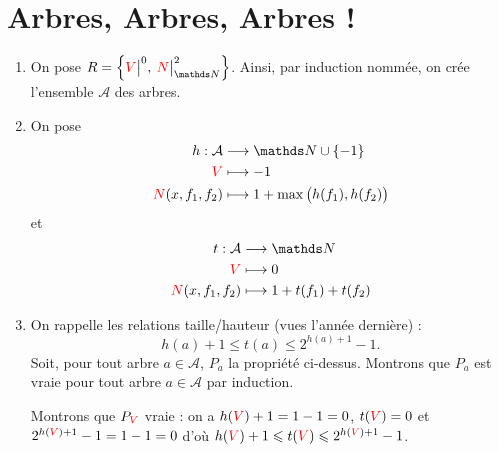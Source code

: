 \section{Arbres, Arbres, Arbres !}

\begin{enumerate}
	\item On pose $R = \Big\{ \red V\big|^0,\:\red N\big|_{\N}^2\Big\}$. Ainsi, par induction nommée, on crée l'ensemble $\mathcal{A}$ des arbres.
	\item On pose \begin{align*}
			h: \mathcal{A} &\longrightarrow \N \cup \{-1\} \\
			\red V &\longmapsto -1\\
			\red N(x, f_1, f_2) &\longmapsto 1 + \max\big( h(f_1), h(f_2) \big)
		\end{align*}
		et \begin{align*}
			t: \mathcal{A} &\longrightarrow \N \\
			\red V &\longmapsto 0\\
			\red N(x, f_1, f_2) &\longmapsto 1 + t(f_1) + t(f_2)\\
		\end{align*}
	\item On rappelle les relations taille/hauteur (vues l'année dernière) : \[
			h(a) + 1 \le t(a) \le 2^{h(a) + 1} - 1
		.\]
		Soit, pour tout arbre $a \in \mathcal{A}$, $P_a$ la propriété ci-dessus.
		Montrons que $P_a$\/ est vraie pour tout arbre $a \in \mathcal{A}$\/ par induction.

		Montrons que $P_{{\color{red}V}}$\/ vraie : on a $h({\color{red}V}) + 1 = 1 - 1 = 0$, $t({\color{red}V}) = 0$\/ et $2^{h({\color{red}V}) + 1} - 1 = 1 - 1 = 0$\/ d'où $h({\color{red}V}) + 1 \leqslant t({\color{red}V}) \leqslant  2^{h({\color{red}V}) + 1} - 1$.


\end{enumerate}
